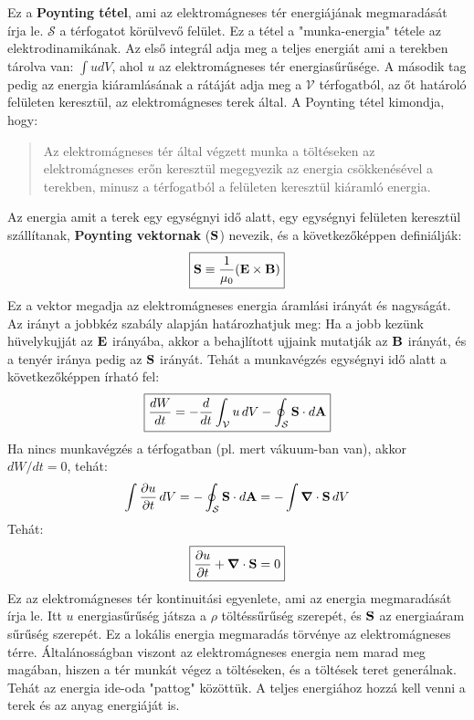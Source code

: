 \documentclass[a4paper,12pt]{article}
\begin{document}
Ez a \textbf{Poynting tétel}, ami az elektromágneses tér energiájának megmaradását írja le. $\mathcal{S}$ a térfogatot körülvevő felület. Ez a tétel a "munka-energia" tétele az elektrodinamikának.
Az első integrál adja meg a teljes energiát ami a terekben tárolva van: $\int u dV$, ahol $u$ az elektromágneses tér energiasűrűsége. A második tag pedig az energia kiáramlásának a rátáját adja meg a $\mathcal{V}$ térfogatból,
az őt határoló felületen keresztül, az elektromágneses terek által. A Poynting tétel kimondja, hogy:
\begin{quote}
    Az elektromágneses tér által végzett munka a töltéseken az elektromágneses erőn keresztül megegyezik az energia csökkenésével a terekben, minusz a térfogatból a felületen keresztül kiáramló energia.
\end{quote}
Az energia amit a terek egy egységnyi idő alatt, egy egységnyi felületen keresztül szállítanak, \textbf{Poynting vektornak} ($\bold{S}$) nevezik, és a következőképpen definiálják:
\begin{equation}
    \boxed{\bold{S} \equiv \frac{1}{\mu_0} (\bold{E} \times \bold{B})}
\end{equation}
Ez a vektor megadja az elektromágneses energia áramlási irányát és nagyságát. Az irányt a jobbkéz szabály alapján határozhatjuk meg: Ha a jobb kezünk hüvelykujját az $\bold{E}$ irányába,
akkor a behajlított ujjaink mutatják az $\bold{B}$ irányát, és a tenyér iránya pedig az $\bold{S}$ irányát.
Tehát a munkavégzés egységnyi idő alatt a következőképpen írható fel:
\begin{equation}
    \boxed{\frac{dW}{dt} = - \frac{d}{dt} \int_{\mathcal{V}} u \, dV - \oint_{\mathcal{S}} \bold{S} \cdot d\bold{A}}
\end{equation}
Ha nincs munkavégzés a térfogatban (pl. mert vákuum-ban van), akkor $dW/dt = 0$, tehát:
\begin{equation}
    \int \frac{\partial u}{\partial t} \, dV = - \oint_{\mathcal{S}} \bold{S} \cdot d\bold{A} = - \int \boldsymbol{\nabla} \cdot \bold{S} \, dV
\end{equation}
Tehát:
\begin{equation}
    \boxed{\frac{\partial u}{\partial t} + \boldsymbol{\nabla} \cdot \bold{S} = 0}
\end{equation}
Ez az elektromágneses tér kontinuitási egyenlete, ami az energia megmaradását írja le. Itt $u$ energiasűrűség játsza a $\rho$ töltéssűrűség szerepét, és $\bold{S}$ az energiaáram sűrűség szerepét.
Ez a lokális energia megmaradás törvénye az elektromágneses térre. Általánosságban viszont az elektromágneses energia nem marad meg magában, hiszen a tér munkát végez a töltéseken,
és a töltések teret generálnak. Tehát az energia ide-oda "pattog" közöttük. A teljes energiához hozzá kell venni a terek és az anyag energiáját is.
\end{document}
